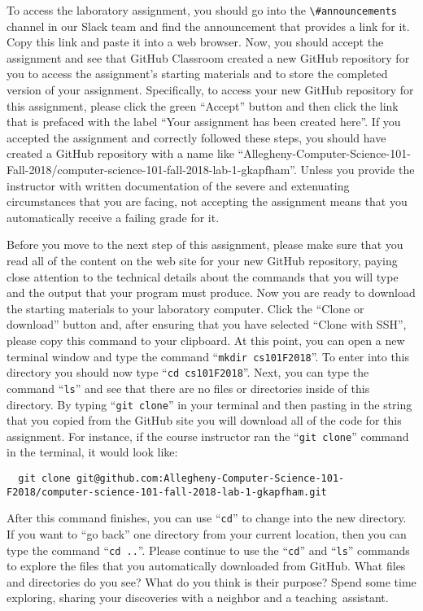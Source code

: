 \documentclass[11pt]{article}
\newcommand{\command}[1]{``\lstinline{#1}''}
\newcommand{\channel}[1]{\lstinline{#1}}
\newcommand{\step}[1]{``{#1}''}
\begin{document}
To access the laboratory assignment, you should go into the
\channel{\#announcements} channel in our Slack team and find the announcement
that provides a link for it. Copy this link and paste it into a web browser.
Now, you should accept the assignment and see that GitHub Classroom created a
new GitHub repository for you to access the assignment's starting materials and
to store the completed version of your assignment. Specifically, to access your
new GitHub repository for this assignment, please click the green ``Accept''
button and then click the link that is prefaced with the label ``Your assignment
has been created here''. If you accepted the assignment and correctly followed
these steps, you should have created a GitHub repository with a name like
``Allegheny-Computer-Science-101-Fall-2018/computer-science-101-fall-2018-lab-1-gkapfham''.
Unless you provide the instructor with written documentation of the severe and
extenuating circumstances that you are facing, not accepting the assignment
means that you automatically receive a failing grade for it.

Before you move to the next step of this assignment, please make sure that you
read all of the content on the web site for your new GitHub repository, paying
close attention to the technical details about the commands that you will type
and the output that your program must produce. Now you are ready to download the
starting materials to your laboratory computer. Click the ``Clone or download''
button and, after ensuring that you have selected ``Clone with SSH'', please
copy this command to your clipboard. At this point, you can open a new terminal
window and type the command \command{mkdir cs101F2018}. To enter into this
directory you should now type \command{cd cs101F2018}. Next, you can type the
command \command{ls} and see that there are no files or directories inside of
this directory. By typing \command{git clone} in your terminal and then pasting
in the string that you copied from the GitHub site you will download all of the
code for this assignment. For instance, if the course instructor ran the
\command{git clone} command in the terminal, it would look like:

\begin{lstlisting}
  git clone git@github.com:Allegheny-Computer-Science-101-F2018/computer-science-101-fall-2018-lab-1-gkapfham.git
\end{lstlisting}

After this command finishes, you can use \command{cd} to change into the new
directory. If you want to \step{go back} one directory from your current
location, then you can type the command \command{cd ..}. Please continue to use
the \command{cd} and \command{ls} commands to explore the files that you
automatically downloaded from GitHub. What files and directories do you see?
What do you think is their purpose? Spend some time exploring, sharing your
discoveries with a neighbor and a \mbox{teaching assistant}.
\end{document}

